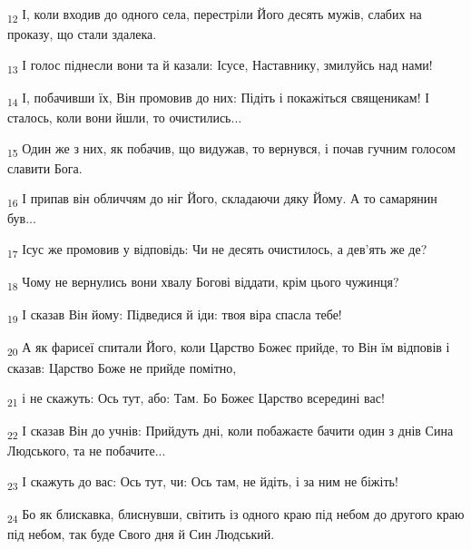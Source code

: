 \begin{tcolorbox}
\textsubscript{12} І, коли входив до одного села, перестріли Його десять мужів, слабих на проказу, що стали здалека.
\end{tcolorbox}
\begin{tcolorbox}
\textsubscript{13} І голос піднесли вони та й казали: Ісусе, Наставнику, змилуйсь над нами!
\end{tcolorbox}
\begin{tcolorbox}
\textsubscript{14} І, побачивши їх, Він промовив до них: Підіть і покажіться священикам! І сталось, коли вони йшли, то очистились...
\end{tcolorbox}
\begin{tcolorbox}
\textsubscript{15} Один же з них, як побачив, що видужав, то вернувся, і почав гучним голосом славити Бога.
\end{tcolorbox}
\begin{tcolorbox}
\textsubscript{16} І припав він обличчям до ніг Його, складаючи дяку Йому. А то самарянин був...
\end{tcolorbox}
\begin{tcolorbox}
\textsubscript{17} Ісус же промовив у відповідь: Чи не десять очистилось, а дев'ять же де?
\end{tcolorbox}
\begin{tcolorbox}
\textsubscript{18} Чому не вернулись вони хвалу Богові віддати, крім цього чужинця?
\end{tcolorbox}
\begin{tcolorbox}
\textsubscript{19} І сказав Він йому: Підведися й іди: твоя віра спасла тебе!
\end{tcolorbox}
\begin{tcolorbox}
\textsubscript{20} А як фарисеї спитали Його, коли Царство Божеє прийде, то Він їм відповів і сказав: Царство Боже не прийде помітно,
\end{tcolorbox}
\begin{tcolorbox}
\textsubscript{21} і не скажуть: Ось тут, або: Там. Бо Божеє Царство всередині вас!
\end{tcolorbox}
\begin{tcolorbox}
\textsubscript{22} І сказав Він до учнів: Прийдуть дні, коли побажаєте бачити один з днів Сина Людського, та не побачите...
\end{tcolorbox}
\begin{tcolorbox}
\textsubscript{23} І скажуть до вас: Ось тут, чи: Ось там, не йдіть, і за ним не біжіть!
\end{tcolorbox}
\begin{tcolorbox}
\textsubscript{24} Бо як блискавка, блиснувши, світить із одного краю під небом до другого краю під небом, так буде Свого дня й Син Людський.
\end{tcolorbox}
